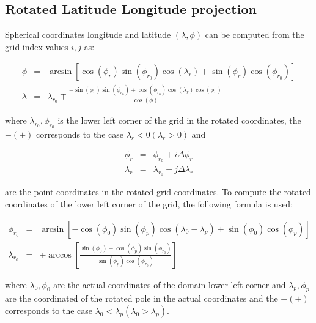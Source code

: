 \subsection{Rotated Latitude Longitude projection}

Spherical coordinates longitude and latitude $(\lambda, \phi)$ can be computed
from the grid index values $i,j$ as:

\begin{eqnarray}
  \phi &=& \arcsin\left[ \cos(\phi_r) \sin(\phi_{r_0}) \cos(\lambda_r) +
           \sin(\phi_r) \cos(\phi_{r_0}) \right] \\
  \lambda &=& \lambda_{r_0} \mp \frac{-\sin(\phi_r) \sin(\phi_{r_0}) +
              \cos(\phi_{r_0}) \cos(\lambda_r) \cos(\phi_r)}{\cos(\phi)}
\end{eqnarray}

where $\lambda_{r_0},\phi_{r_0}$ is the lower left corner of the grid in
the rotated coordinates, the $- (+)$ corresponds to the case $\lambda_r < 0
(\lambda_r > 0)$ and

\begin{eqnarray}
  \phi_r &=& \phi_{r_0} + i \Delta\phi_r \\
  \lambda_r &=& \lambda_{r_0} + j \Delta\lambda_r
\end{eqnarray}

are the point coordinates in the rotated grid coordinates. To compute the
rotated coordinates of the lower left corner of the grid, the following
formula is used:

\begin{eqnarray}
  \phi_{r_0} &=& \arcsin \left[ -\cos(\phi_0) \sin(\phi_p)
           \cos(\lambda_0 - \lambda_p) + \sin(\phi_0) \cos(\phi_p)\right] \\
  \lambda_{r_0} &=& \mp \arccos \left[\frac{\sin(\phi_0) -
          \cos(\phi_p) \sin(\phi_{r_0})}{\sin(\phi_p) \cos(\phi_{r_0})}\right]
\end{eqnarray}

where $\lambda_0,\phi_0$ are the actual coordinates of the domain lower left
corner and $\lambda_p,\phi_p$ are the coordinated of the rotated pole in the
actual coordinates and the $- (+)$ corresponds to the case
$\lambda_0 < \lambda_p (\lambda_0 > \lambda_p)$.

